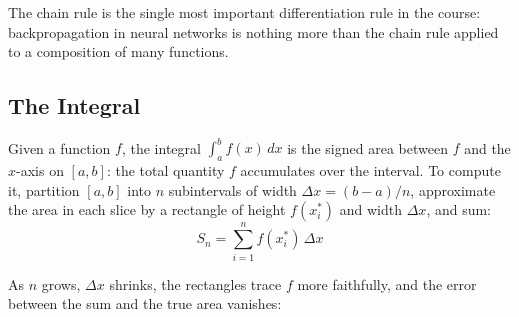 \documentclass[main.tex]{subfiles}
\begin{document}
The chain rule is the single most important differentiation rule in the course: backpropagation in neural networks is nothing more than the chain rule applied to a composition of many functions.

\subsection{The Integral}

Given a function $f$, the integral $\int_a^b f(x)\,dx$ is the signed area between $f$ and the $x$-axis on $[a, b]$: the total quantity $f$ accumulates over the interval. To compute it, partition $[a, b]$ into $n$ subintervals of width $\Delta x = (b - a)/n$, approximate the area in each slice by a rectangle of height $f(x_i^*)$ and width $\Delta x$, and sum:
$$S_n = \sum_{i=1}^{n} f(x_i^*)\,\Delta x$$

As $n$ grows, $\Delta x$ shrinks, the rectangles trace $f$ more faithfully, and the error between the sum and the true area vanishes:
\end{document}
